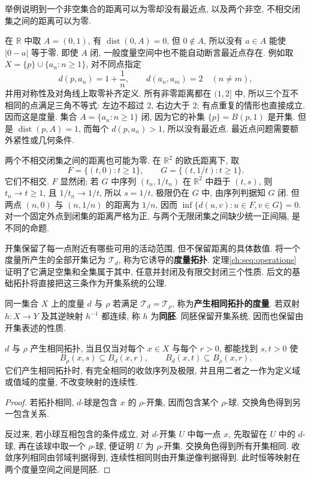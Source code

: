 \begin{example}
举例说明到一个非空集合的距离可以为零却没有最近点, 以及两个非空, 不相交闭集之间的距离可以为零.
\end{example}
\begin{solution}
在 $\mathbb{R}$ 中取 $A=(0,1)$, 有 $\operatorname{dist}(0,A)=0$, 但 $0\notin A$, 所以没有 $a\in A$ 能使 $|0-a|$ 等于零. 即使 $A$ 闭, 一般度量空间中也不能自动断言最近点存在. 例如取 $X=\{p\}\cup\{a_n:n\ge1\}$, 对不同点指定
\[
 d(p,a_n)=1+\frac1n,\qquad d(a_n,a_m)=2\quad(n\ne m),
\]
并用对称性及对角线上取零补齐定义. 所有非零距离都在 $(1,2]$ 中, 所以三个互不相同的点满足三角不等式: 左边不超过 $2$, 右边大于 $2$; 有点重复的情形也直接成立. 因而这是度量. 集合 $A=\{a_n:n\ge1\}$ 闭, 因为它的补集 $\{p\}=B(p,1)$ 是开集. 但是 $\operatorname{dist}(p,A)=1$, 而每个 $d(p,a_n)>1$, 所以没有最近点. 最近点问题需要额外紧性或几何条件.

两个不相交闭集之间的距离也可能为零. 在 $\mathbb{R}^2$ 的欧氏距离下, 取
\[
 F=\{(t,0):t\ge1\},\qquad
 G=\{(t,1/t):t\ge1\}.
\]
它们不相交. $F$ 显然闭; 若 $G$ 中序列 $(t_n,1/t_n)$ 在 $\mathbb{R}^2$ 中趋于 $(t,s)$, 则 $t_n\to t\ge1$, 且 $1/t_n\to1/t$, 所以 $s=1/t$, 极限仍在 $G$ 中, 由序列判据知 $G$ 闭. 但两点 $(n,0)$ 与 $(n,1/n)$ 的距离为 $1/n$, 因而
$\inf\{d(u,v):u\in F,v\in G\}=0$. 对一个固定外点到闭集的距离严格为正, 与两个无限闭集之间缺少统一正间隔, 是不同的命题.
\end{solution}

\label{ch:seq:equivalent-metrics}
开集保留了每一点附近有哪些可用的活动范围, 但不保留距离的具体数值. 将一个度量所产生的全部开集记为 $\mathcal{T}_d$, 称为它诱导的\textbf{度量拓扑}. 定理\ref{ch:seq:operations} 证明了它满足空集和全集属于其中, 任意并封闭及有限交封闭三个性质. 后文的基础拓扑将直接把这三条作为开集系统的公理.

\begin{definition}[同拓扑的度量与同胚]
同一集合 $X$ 上的度量 $d$ 与 $\rho$ 若满足 $\mathcal{T}_d=\mathcal{T}_\rho$, 称为\textbf{产生相同拓扑的度量}. 若双射 $h:X\to Y$ 及其逆映射 $h^{-1}$ 都连续, 称 $h$ 为\textbf{同胚}. 同胚保留开集系统, 因而也保留由开集表述的性质.
\end{definition}

\begin{proposition}[比较小球]\label{ch:seq:same-topology}
$d$ 与 $\rho$ 产生相同拓扑, 当且仅当对每个 $x\in X$ 与每个 $r>0$, 都能找到 $s,t>0$ 使
\[
 B_\rho(x,s)\subseteq B_d(x,r),\qquad
 B_d(x,t)\subseteq B_\rho(x,r).
\]
它们产生相同拓扑时, 有完全相同的收敛序列及极限, 并且用二者之一作为定义域或值域的度量, 不改变映射的连续性.
\end{proposition}
\begin{proof}
若拓扑相同, $d$-球是包含 $x$ 的 $\rho$-开集, 因而包含某个 $\rho$-球. 交换角色得到另一包含关系.

反过来, 若小球互相包含的条件成立, 对 $d$-开集 $U$ 中每一点 $x$, 先取留在 $U$ 中的 $d$-球, 再在该球中取一个 $\rho$-球, 便证明 $U$ 为 $\rho$-开集. 交换角色得到所有开集相同. 收敛序列相同由邻域判据得到, 连续性相同则由开集逆像判据得到. 此时恒等映射在两个度量空间之间是同胚.
\end{proof}

